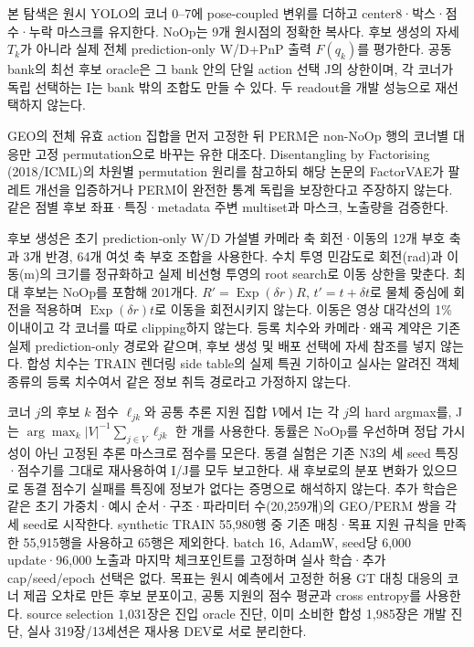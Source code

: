 본 탐색은 원시 YOLO의 코너 0--7에 pose-coupled 변위를 더하고 center8·박스·점수·누락 마스크를 유지한다. NoOp는 9개 원시점의 정확한 복사다. 후보 생성의 자세 $T_k$가 아니라 실제 전체 prediction-only W/D+PnP 출력 $F(q_k)$를 평가한다. 공동 bank의 최선 후보 oracle은 그 bank 안의 단일 action 선택 J의 상한이며, 각 코너가 독립 선택하는 I는 bank 밖의 조합도 만들 수 있다. 두 readout을 개발 성능으로 재선택하지 않는다.

GEO의 전체 유효 action 집합을 먼저 고정한 뒤 PERM은 non-NoOp 행의 코너별 대응만 고정 permutation으로 바꾸는 유한 대조다. Disentangling by Factorising (2018/ICML)의 차원별 permutation 원리\cite{factorvae2018}를 참고하되 해당 논문의 FactorVAE가 팔레트 개선을 입증하거나 PERM이 완전한 통계 독립을 보장한다고 주장하지 않는다. 같은 점별 후보 좌표·특징·metadata 주변 multiset과 마스크, 노출량을 검증한다.

후보 생성은 초기 prediction-only W/D 가설별 카메라 축 회전·이동의 12개 부호 축과 3개 반경, 64개 여섯 축 부호 조합을 사용한다. 수치 투영 민감도로 회전(rad)과 이동(m)의 크기를 정규화하고 실제 비선형 투영의 root search로 이동 상한을 맞춘다. 최대 후보는 NoOp를 포함해 201개다. $R'=\operatorname{Exp}(\delta r)R$, $t'=t+\delta t$로 물체 중심에 회전을 적용하며 $\operatorname{Exp}(\delta r)t$로 이동을 회전시키지 않는다. 이동은 영상 대각선의 1\% 이내이고 각 코너를 따로 clipping하지 않는다. 등록 치수와 카메라·왜곡 계약은 기존 실제 prediction-only 경로와 같으며, 후보 생성 및 배포 선택에 자세 참조를 넣지 않는다. 합성 치수는 TRAIN 렌더링 side table의 실제 특권 기하이고 실사는 알려진 객체 종류의 등록 치수여서 같은 정보 취득 경로라고 가정하지 않는다.

코너 $j$의 후보 $k$ 점수 $\ell_{jk}$와 공통 추론 지원 집합 $V$에서 I는 각 $j$의 hard argmax를, J는 $\arg\max_k |V|^{-1}\sum_{j\in V}\ell_{jk}$ 한 개를 사용한다. 동률은 NoOp를 우선하며 정답 가시성이 아닌 고정된 추론 마스크로 점수를 모은다. 동결 실험은 기존 N3의 세 seed 특징·점수기를 그대로 재사용하여 I/J를 모두 보고한다. 새 후보로의 분포 변화가 있으므로 동결 점수기 실패를 특징에 정보가 없다는 증명으로 해석하지 않는다. 추가 학습은 같은 초기 가중치·예시 순서·구조·파라미터 수(20,259개)의 GEO/PERM 쌍을 각 세 seed로 시작한다. synthetic TRAIN 55,980행 중 기존 매칭·목표 지원 규칙을 만족한 55,915행을 사용하고 65행은 제외한다. batch 16, AdamW, seed당 6,000 update·96,000 노출과 마지막 체크포인트를 고정하며 실사 학습·추가 cap/seed/epoch 선택은 없다. 목표는 원시 예측에서 고정한 허용 GT 대칭 대응의 코너 제곱 오차로 만든 후보 분포이고, 공통 지원의 점수 평균과 cross entropy를 사용한다. source selection 1,031장은 진입 oracle 진단, 이미 소비한 합성 1,985장은 개발 진단, 실사 319장/13세션은 재사용 DEV로 서로 분리한다.






